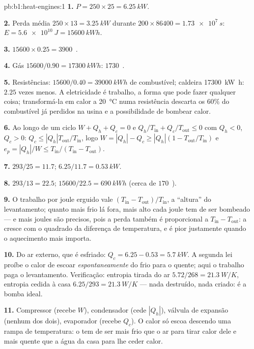 \begin{solution}{pb:b1:heat-engines:1}
\textbf{1.} $P = 250 \times 25 = \qty{6.25}{kW}$.

\textbf{2.} Perda média $250 \times 13 = \qty{3.25}{kW}$ durante $200 \times 86400 =
\qty{1.73e7}{s}$: $E = \qty{5.6e10}{J} = \qty{15600}{kW h}$.

\textbf{3.} $15600 \times 0.25 = 3900$~\texteuro.

\textbf{4.} Gás $15600/0.90 = \qty{17300}{kW h}$: $1730$~\texteuro.

\textbf{5.} Resistências: $15600/0.40 = \qty{39000}{kW h}$ de combustível; caldeira
\qty{17300}{kW h}: $2.25$ vezes menos. A eletricidade é trabalho, a forma que pode
fazer qualquer coisa; transformá-la em calor a \qty{20}{\degreeCelsius} numa resistência
descarta os $60\%$ do combustível já perdidos na usina e a
possibilidade de bombear calor.

\textbf{6.} Ao longo de um ciclo $W + Q_h + Q_c = 0$ e $Q_h/T_{\mathrm{in}} +
Q_c/T_{\mathrm{out}} \leq 0$ com $Q_h < 0$, $Q_c > 0$: $Q_c \leq
|Q_h|T_{\mathrm{out}}/T_{\mathrm{in}}$, logo $W = |Q_h| - Q_c \geq |Q_h|(1 -
T_{\mathrm{out}}/T_{\mathrm{in}})$ e $e_p = |Q_h|/W \leq T_{\mathrm{in}}/(T_{\mathrm{in}} -
T_{\mathrm{out}})$.

\textbf{7.} $293/25 = 11.7$; $6.25/11.7 = \qty{0.53}{kW}$.

\textbf{8.} $293/13 = 22.5$; $15600/22.5 = \qty{690}{kW h}$ (cerca de
$170$~\texteuro).

\textbf{9.} O trabalho por joule erguido vale $(T_{\mathrm{in}} - T_{\mathrm{out}})/
T_{\mathrm{in}}$, a ``altura'' do levantamento; quanto mais frio lá fora,
mais alto cada joule tem de ser bombeado --- e mais joules são precisos, pois
a perda também é proporcional a $T_{\mathrm{in}} - T_{\mathrm{out}}$: a
 cresce com o quadrado da diferença de temperatura, e é pior
justamente quando o aquecimento mais importa.

\textbf{10.} Do ar externo, que é esfriado: $Q_c = 6.25 - 0.53 =
\qty{5.7}{kW}$. A segunda lei proíbe o calor de escoar \emph{espontaneamente}
do frio para o quente; aqui o trabalho paga o levantamento. Verificação: entropia tirada do
ar $5.72/268 = \qty{21.3}{W/K}$, entropia cedida à casa $6.25/293 =
\qty{21.3}{W/K}$ --- nada destruído, nada criado: é a bomba ideal.

\textbf{11.} Compressor (recebe $W$), condensador (cede $|Q_h|$),
válvula de expansão (nenhum dos dois), evaporador (recebe $Q_c$). O calor só escoa
descendo uma rampa de temperatura: o  tem de ser mais frio que o ar para
tirar calor dele e mais quente que a água da casa para lhe ceder calor.


\end{solution}
